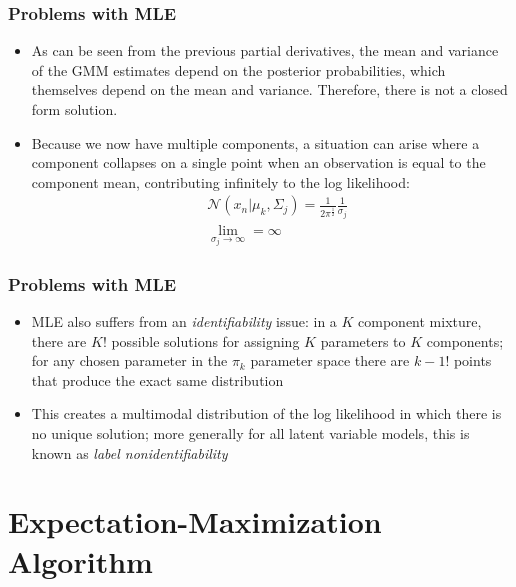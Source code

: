 \documentclass{beamer}
\begin{document}
\begin{frame}
\frametitle{Problems with MLE}
\begin{itemize}
	\item As can be seen from the previous partial derivatives, the mean and variance of the GMM estimates depend on the posterior probabilities, which themselves depend on the mean and variance. Therefore, there is not a closed form solution.
	\item Because we now have multiple components, a situation can arise where a component collapses on a single point when an observation is equal to the component mean, contributing infinitely to the log likelihood:
	\begin{align*}
	&\mathcal{N}(x_n|\mu_k, \Sigma_j) = \frac{1}{2\pi^{\frac{1}{2}}}\frac{1}{\sigma_j}\\ 
	&\lim_{\sigma_j \to \infty} = \infty
	\end{align*}
\end{itemize}

\end{frame}

\begin{frame}
\frametitle{Problems with MLE}
	\begin{itemize}
		\item MLE also suffers from an \textit{identifiability} issue: in a $K$ component mixture, there are $K!$ possible solutions for assigning $K$ parameters to $K$ components; for any chosen parameter in the $\pi_k$ parameter space there are $k-1!$ points that produce the exact same distribution
		\item This creates a multimodal distribution of the log likelihood in which there is no unique solution; more generally for all latent variable models, this is known as \textit{label nonidentifiability}
	\end{itemize}
\end{frame}

\section{Expectation-Maximization Algorithm}
\end{document}
